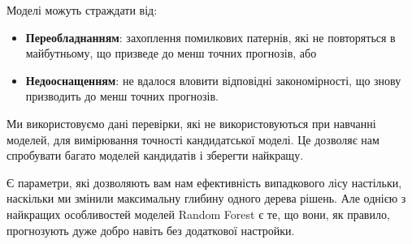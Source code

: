 \Conclusion %

Моделі можуть страждати від:

\begin{itemize}
    \item \textbf{Переобладнанням}: захоплення помилкових патернів, які не повторяться в майбутньому, що призведе до менш точних прогнозів, або
    \item \textbf{Недооснащенням}: не вдалося вловити відповідні закономірності, що знову призводить до менш точних прогнозів.
\end{itemize}
Ми використовуємо дані перевірки, які не використовуються при навчанні моделей, для вимірювання точності кандидатської моделі.
Це дозволяє нам спробувати багато моделей кандидатів і зберегти найкращу.

Є параметри, які дозволяють вам нам ефективність випадкового лісу настільки, наскільки ми змінили максимальну глибину одного дерева рішень.
Але однією з найкращих особливостей моделей Random Forest є те, що вони, як правило, прогнозують дуже добро навіть без додаткової настройки.
